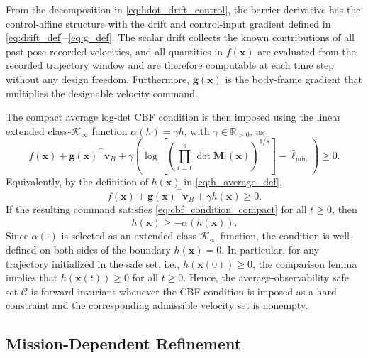 \documentclass[journal]{IEEEtran}
\begin{document}
From the decomposition in \eqref{eq:hdot_drift_control}, the barrier derivative has the control-affine structure with the drift and control-input gradient defined in \eqref{eq:drift_def}--\eqref{eq:g_def}. The scalar drift collects the known contributions of all past-pose recorded velocities, and all quantities in $f(\bm{x})$ are evaluated from the recorded trajectory window and are therefore computable at each time step without any design freedom. Furthermore, $\bm{g}(\bm{x})$ is the body-frame gradient that multiplies the designable velocity command.

The compact average log-det CBF condition is then imposed using the linear extended class-$\mathcal{K}_{\infty}$ function $\alpha(h)=\gamma h$, with $\gamma \in \mathbb{R}_{>0}$, as
\begin{equation}
  f(\bm{x})+\bm{g}(\bm{x})^{\top}\bm{v}_{B}
  +\gamma
  \left(
  \log\left[
  \left(
  \prod_{i=1}^{s}\det\bm{M}_{i}(\bm{x})
  \right)^{1/s}
  \right]
  - \bar{\ell}_{\min}
  \right)
  \ge 0.
  \label{eq:cbf_condition_average}
\end{equation}
Equivalently, by the definition of $h(\bm{x})$ in \eqref{eq:h_average_def},
\begin{equation}
  f(\bm{x})+\bm{g}(\bm{x})^{\top}\bm{v}_{B}
  +\gamma h(\bm{x}) \ge 0.
  \label{eq:cbf_condition_compact}
\end{equation}
If the resulting command satisfies \eqref{eq:cbf_condition_compact} for all $t \geq 0$, then
\begin{equation}
  \dot{h}(\bm{x}) \ge -\alpha(h(\bm{x})).
\end{equation}
Since $\alpha(\cdot)$ is selected as an extended class-$\mathcal{K}_{\infty}$ function, the condition is well-defined on both sides of the boundary $h(\bm{x})=0$. In particular, for any trajectory initialized in the safe set, i.e., $h(\bm{x}(0))\ge0$, the comparison lemma implies that $h(\bm{x}(t))\ge0$ for all $t\ge0$. Hence, the average-observability safe set $\mathcal{C}$ is forward invariant whenever the CBF condition is imposed as a hard constraint and the corresponding admissible velocity set is nonempty.




\subsection{Mission-Dependent Refinement}
\end{document}
